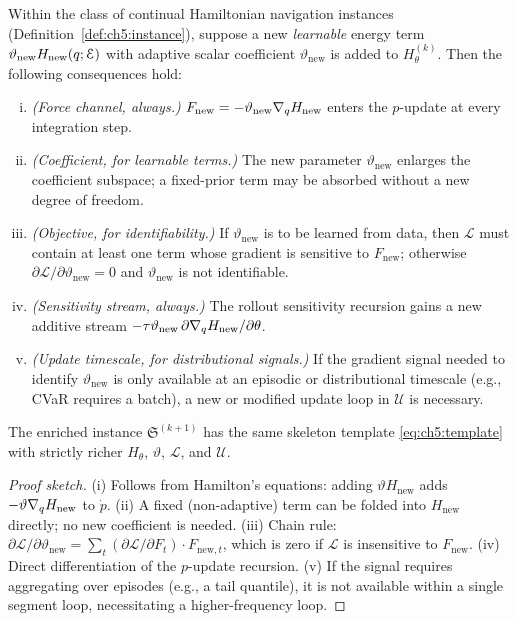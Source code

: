 \begin{theorem}
\label{thm:ch5:enrichment}
Within the class of continual Hamiltonian navigation instances
(Definition~\ref{def:ch5:instance}), suppose a new \emph{learnable}
energy term $\vartheta_{\mathrm{new}} H_{\mathrm{new}}(q;\mathcal{E})$
with adaptive scalar coefficient $\vartheta_{\mathrm{new}}$ is added to
$H_\theta^{(k)}$.
Then the following consequences hold:
\begin{enumerate}[(i)]
  \item \emph{(Force channel, always.)} $F_{\mathrm{new}} = -\vartheta_{\mathrm{new}}\nabla_q H_{\mathrm{new}}$
        enters the $p$-update at every integration step.
  \item \emph{(Coefficient, for learnable terms.)} The new parameter
        $\vartheta_{\mathrm{new}}$ enlarges the coefficient subspace; a
        fixed-prior term may be absorbed without a new degree of freedom.
  \item \emph{(Objective, for identifiability.)} If $\vartheta_{\mathrm{new}}$
        is to be learned from data, then $\mathcal{L}$ must contain at least
        one term whose gradient is sensitive to $F_{\mathrm{new}}$; otherwise
        $\partial\mathcal{L}/\partial\vartheta_{\mathrm{new}} = 0$ and
        $\vartheta_{\mathrm{new}}$ is not identifiable.
  \item \emph{(Sensitivity stream, always.)} The rollout sensitivity
        recursion gains a new additive stream
        $-\tau\vartheta_{\mathrm{new}}\,\partial\nabla_q H_{\mathrm{new}}/\partial\theta$.
  \item \emph{(Update timescale, for distributional signals.)} If the
        gradient signal needed to identify $\vartheta_{\mathrm{new}}$ is
        only available at an episodic or distributional timescale (e.g.,
        CVaR requires a batch), a new or modified update loop in
        $\mathcal{U}$ is necessary.
\end{enumerate}
The enriched instance $\mathfrak{S}^{(k+1)}$ has the same skeleton
template \eqref{eq:ch5:template} with strictly richer
$H_\theta$, $\vartheta$, $\mathcal{L}$, and $\mathcal{U}$.
\end{theorem}

\begin{proof}[Proof sketch]
(i) Follows from Hamilton's equations: adding $\vartheta H_{\mathrm{new}}$
adds $-\vartheta\nabla_q H_{\mathrm{new}}$ to $\dot{p}$.
(ii) A fixed (non-adaptive) term can be folded into $H_{\mathrm{new}}$
directly; no new coefficient is needed.
(iii) Chain rule: $\partial\mathcal{L}/\partial\vartheta_{\mathrm{new}}
= \sum_t (\partial\mathcal{L}/\partial F_t) \cdot F_{\mathrm{new},t}$,
which is zero if $\mathcal{L}$ is insensitive to $F_{\mathrm{new}}$.
(iv) Direct differentiation of the $p$-update recursion.
(v) If the signal requires aggregating over episodes (e.g., a tail
quantile), it is not available within a single segment loop, necessitating
a higher-frequency loop.
\end{proof}

